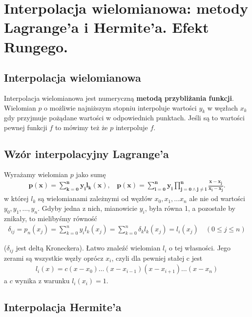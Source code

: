 \documentclass[main.tex]{subfiles}
\begin{document}
    \newpage


    \section{Interpolacja wielomianowa: metody Lagrange'a i Hermite'a. Efekt Rungego.}

    \subsection{Interpolacja wielomianowa}

    Interpolacja wielomianowa jest numeryczną \textbf{metodą przybliżania funkcji}.
    Wielomian $p$ o możliwie najniższym stopniu interpoluje wartości $y_k$ w węzłach $x_k$ gdy przyjmuje pożądane wartości
    w odpowiednich punktach. Jeśli są to wartości pewnej funkcji $f$ to mówimy też że $p$ interpoluje $f$.

    \subsection{Wzór interpolacyjny Lagrange'a}

    Wyrażamy wielomian $p$ jako sumę
    \begin{align*}
        \mathbf{p(x)=\sum _{k=0}^{n}y_{i}l_k(x), ~~~~
        p(x)=\sum _{i=0}^{n}y_{i}\prod _{j=0\land j\neq i}^{n}{\frac {x-x_{j}}{x_{i}-x_{j}}}}.
    \end{align*}
    w której $l_k$ są wielomianami zależnymi od węzłów $x_0,x_1, \dots x_n$ ale nie od wartości $y_0,y_1, \dots ,y_n$.
    Gdyby jedna z nich, mianowicie $y_i$, była równa 1, a pozostałe by znikały, to mielibyśmy równość
    \begin{align*}
        \delta_{ij} = p_n(x_j)=\sum _{k=0}^{n}y_{i}l_k(x_j)=\sum _{k=0}^{n}\delta_k l_k (x_j)=l_i(x_j) \quad (0 \leq j \leq n)
    \end{align*}

    ($\delta_{ij}$ jest deltą Kroneckera). Łatwo znaleźć wielomian $l_i$ o tej własności. Jego zerami są wszystkie węzły
    oprócz $x_i$, czyli dla pewniej stałej c jest
    \begin{align*}
        l_i(x)=c(x-x_0)\dots(x-x_{i-1})(x-x_{i+1})\dots(x-x_n)
    \end{align*}
    a $c$ wynika z warunku $l_i(x_i)=1$.


    \subsection{Interpolacja Hermite’a}
\end{document}
